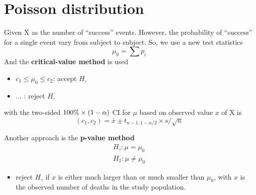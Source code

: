 \section{Poisson distribution}
\label{sec:poisson-distribution-1}

Given X as the number of ``success'' events. However, the probability
of ``success'' for a single event vary from subject to subject. So, we
use a new test statistics
\begin{equation}
  \label{eq:98}
  \mu_0 = \sum p_i
\end{equation}
And the {\bf critical-value method} is used
\begin{itemize}
\item $c_1 \le \mu_0 \le c_2$: accept $H_\circ$
\item ... : reject $H_\circ$
\end{itemize}
with the two-sided $100\%\times (1-\alpha)$ CI for $\mu$ based on observed value $x$ of X
is
\begin{equation}
  \label{eq:99}
  (c_1,c_2) = \bar{x} \pm t_{n-1,1-\alpha/2} \times s/\sqrt{n}
\end{equation}



Another approach is the {\bf p-value method}
\begin{eqnarray*}
  H_\circ:\mu=\mu_0 \\
 H_1:\mu\ne \mu_0
\end{eqnarray*}
\begin{itemize}
\item reject $H_\circ$ if $x$ is either much larger than or much
  smaller than $\mu_0$, with $x$ is the observed number of deaths in
  the study population. 
\end{itemize}


